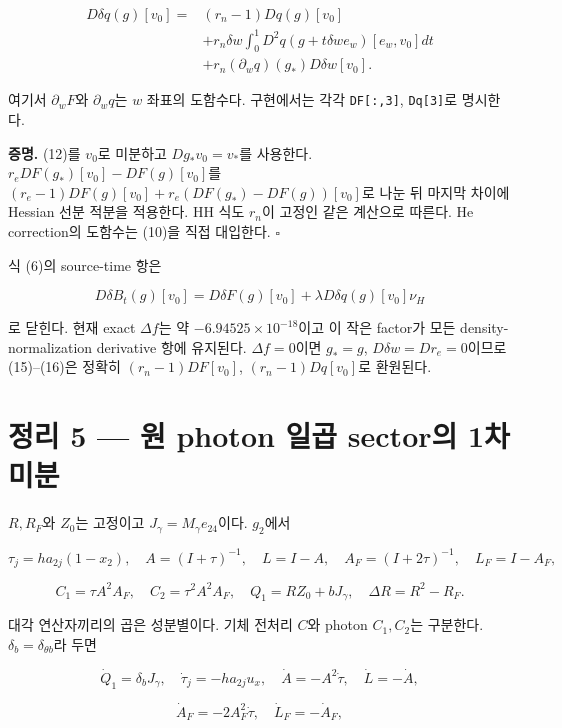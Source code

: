 \[
\boxed{\begin{aligned}
D\delta q(g)[v_0]={}&(r_n-1)Dq(g)[v_0]\\
&+r_n\delta w\int_0^1D^2q(g+t\delta w e_w)[e_w,v_0]dt\\
&+r_n(\partial_wq)(g_*)D\delta w[v_0].
\end{aligned}}
\tag{16}
\]

여기서 \(\partial_wF\)와 \(\partial_wq\)는 \(w\) 좌표의 도함수다. 구현에서는 각각 \texttt{DF{[}:,3{]}}, \texttt{Dq{[}3{]}}로 명시한다.

\textbf{증명.} (12)를 \(v_0\)로 미분하고 \(Dg_*v_0=v_*\)를 사용한다. \(r_eDF(g_*)[v_0]-DF(g)[v_0]\)를 \((r_e-1)DF(g)[v_0]+r_e(DF(g_*)-DF(g))[v_0]\)로 나눈 뒤 마지막 차이에 Hessian 선분 적분을 적용한다. HH 식도 \(r_n\)이 고정인 같은 계산으로 따른다. He correction의 도함수는 (10)을 직접 대입한다. \(\square\)

식 (6)의 source-time 항은

\[
D\delta B_t(g)[v_0]=D\delta F(g)[v_0]+\lambda D\delta q(g)[v_0]\nu_H
\]

로 닫힌다. 현재 exact \(\Delta f\)는 약 \(-6.94525\times10^{-18}\)이고 이 작은 factor가 모든 density-normalization derivative 항에 유지된다. \(\Delta f=0\)이면 \(g_*=g\), \(D\delta w=Dr_e=0\)이므로 (15)--(16)은 정확히 \((r_n-1)DF[v_0]\), \((r_n-1)Dq[v_0]\)로 환원된다.

\hypertarget{uxc815uxb9ac-5-uxc6d0-photon-uxc77cuxacf1-sectoruxc758-1uxcc28-uxbbf8uxbd84}{%
\section{정리 5 --- 원 photon 일곱 sector의 1차 미분}\label{uxc815uxb9ac-5-uxc6d0-photon-uxc77cuxacf1-sectoruxc758-1uxcc28-uxbbf8uxbd84}}

\(R,R_F\)와 \(Z_0\)는 고정이고 \(J_\gamma=M_\gamma e_{24}\)이다. \(g_2\)에서

\[
\tau_j=ha_{2j}(1-x_2),\quad A=(I+\tau)^{-1},\quad
L=I-A,\quad A_F=(I+2\tau)^{-1},\quad L_F=I-A_F,
\]

\[
C_1=\tau A^2A_F,\quad C_2=\tau^2A^2A_F,\quad
Q_1=RZ_0+bJ_\gamma,\quad\Delta R=R^2-R_F.
\]

대각 연산자끼리의 곱은 성분별이다. 기체 전처리 \(C\)와 photon \(C_1,C_2\)는 구분한다. \(\delta_b=\delta_{\theta b}\)라 두면

\[
\dot Q_1=\delta_bJ_\gamma,\quad
\dot\tau_j=-ha_{2j}u_x,\quad
\dot A=-A^2\dot\tau,\quad \dot L=-\dot A,
\]

\[
\dot A_F=-2A_F^2\dot\tau,\quad \dot L_F=-\dot A_F,
\]

